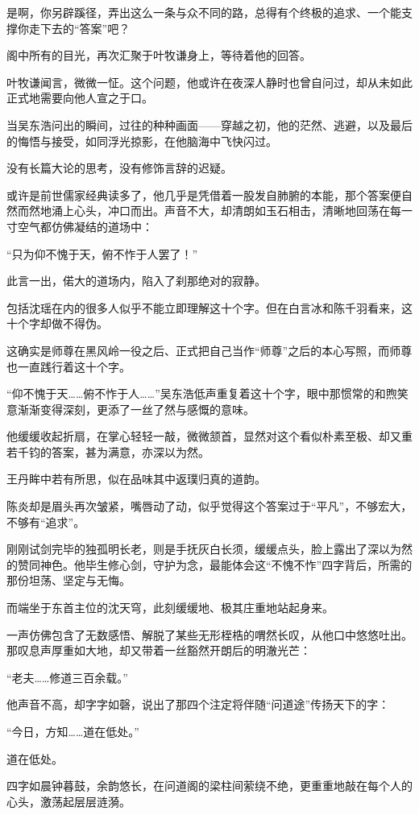 是啊，你另辟蹊径，弄出这么一条与众不同的路，总得有个终极的追求、一个能支撑你走下去的“答案”吧？

阁中所有的目光，再次汇聚于叶牧谦身上，等待着他的回答。

叶牧谦闻言，微微一怔。这个问题，他或许在夜深人静时也曾自问过，却从未如此正式地需要向他人宣之于口。

当吴东浩问出的瞬间，过往的种种画面——穿越之初，他的茫然、逃避，以及最后的悔悟与接受，如同浮光掠影，在他脑海中飞快闪过。

没有长篇大论的思考，没有修饰言辞的迟疑。

或许是前世儒家经典读多了，他几乎是凭借着一股发自肺腑的本能，那个答案便自然而然地涌上心头，冲口而出。声音不大，却清朗如玉石相击，清晰地回荡在每一寸空气都仿佛凝结的道场中：

“只为仰不愧于天，俯不怍于人罢了！”

此言一出，偌大的道场内，陷入了刹那绝对的寂静。

包括沈瑶在内的很多人似乎不能立即理解这十个字。但在白言冰和陈千羽看来，这十个字却做不得伪。

这确实是师尊在黑风岭一役之后、正式把自己当作“师尊”之后的本心写照，而师尊也一直践行着这十个字。

“仰不愧于天……俯不怍于人……”吴东浩低声重复着这十个字，眼中那惯常的和煦笑意渐渐变得深刻，更添了一丝了然与感慨的意味。

他缓缓收起折扇，在掌心轻轻一敲，微微颔首，显然对这个看似朴素至极、却又重若千钧的答案，甚为满意，亦深以为然。

王丹眸中若有所思，似在品味其中返璞归真的道韵。

陈炎却是眉头再次皱紧，嘴唇动了动，似乎觉得这个答案过于“平凡”，不够宏大，不够有“追求”。

刚刚试剑完毕的独孤明长老，则是手抚灰白长须，缓缓点头，脸上露出了深以为然的赞同神色。他毕生修心剑，守护为念，最能体会这“不愧不怍”四字背后，所需的那份坦荡、坚定与无悔。

而端坐于东首主位的沈天穹，此刻缓缓地、极其庄重地站起身来。

一声仿佛包含了无数感悟、解脱了某些无形桎梏的喟然长叹，从他口中悠悠吐出。那叹息声厚重如大地，却又带着一丝豁然开朗后的明澈光芒：

“老夫……修道三百余载。”

他声音不高，却字字如磬，说出了那四个注定将伴随“问道途”传扬天下的字：

“今日，方知……道在低处。”

道在低处。

四字如晨钟暮鼓，余韵悠长，在问道阁的梁柱间萦绕不绝，更重重地敲在每个人的心头，激荡起层层涟漪。

